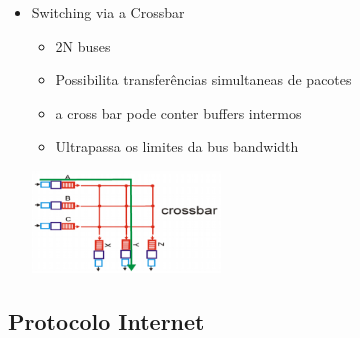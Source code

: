 \documentclass[../resumosRCOM.tex]{subfiles}
\begin{document}
\begin{itemize}
\begin{itemize}
\begin{itemize}
\begin{center}
            \end{center}
            \item Switching via a Crossbar
            \begin{itemize}
                \item 2N buses
                \item Possibilita transferências simultaneas de pacotes
                \item a cross bar pode conter buffers intermos
                \item Ultrapassa os limites da bus bandwidth
            \end{itemize}
            \begin{center}
                \includegraphics[width=5cm]{images/RCOM8.png}
            \end{center}
        \end{itemize}
    \end{itemize}
\end{itemize}

\subsection{Protocolo Internet}
\end{document}
